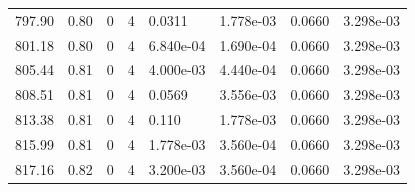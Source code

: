 \documentclass[preview]{standalone}
\begin{document}
{{{{{\begin{tabular}{L{1.2cm}C{1.2cm} C{0.3cm}C{0.5cm} C{1.4cm}C{1.4cm} C{1.4cm}C{1.4cm}}
  797.90  &  0.80  & 0     &  4 &  0.0311  & 1.778e-03  & 0.0660 &  3.298e-03   \\ 
  801.18  &  0.80  & 0     &  4 &  6.840e-04  & 1.690e-04  & 0.0660 &  3.298e-03   \\ 
  805.44  &  0.81  & 0     &  4 &  4.000e-03  & 4.440e-04  & 0.0660 &  3.298e-03   \\ 
  808.51  &  0.81  & 0     &  4 &  0.0569  & 3.556e-03  & 0.0660 &  3.298e-03   \\ 
  813.38  &  0.81  & 0     &  4 &  0.110  & 1.778e-03  & 0.0660 &  3.298e-03   \\ 
  815.99  &  0.81  & 0     &  4 &  1.778e-03  & 3.560e-04  & 0.0660 &  3.298e-03   \\ 
  817.16  &  0.82  & 0     &  4 &  3.200e-03  & 3.560e-04  & 0.0660 &  3.298e-03   \\ 
\hline 
\end{tabular} 

}}}}}
\end{document}
